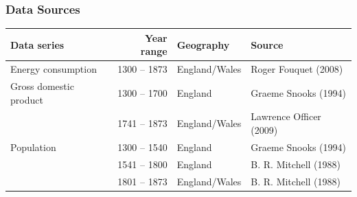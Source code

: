 \documentclass[final]{beamer}
\begin{document}
\begin{frame}
\frametitle{Data Sources}
\footnotesize{
\begin{table}[p!]
\label{tbl:dataSources}
\begin{tabular}{lrll}
Data series&Year range&Geography&Source\\
\hline
Energy consumption&1300 -- 1873&England/Wales&Roger Fouquet (2008)\\
\hline
Gross domestic product&1300 -- 1700&England&Graeme Snooks (1994)\\
&1741 -- 1873&England/Wales&Lawrence Officer (2009)\\
\hline
Population&1300 -- 1540&England&Graeme Snooks (1994)\\
&1541 -- 1800&England&B. R. Mitchell (1988)\\
&1801 -- 1873&England/Wales&B. R. Mitchell (1988)\\
\end{tabular}
\end{table}
}
\end{frame}

\end{document}
